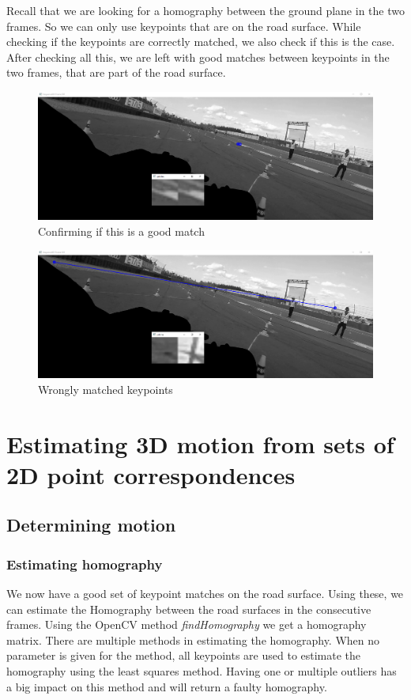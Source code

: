 Recall that we are looking for a homography between the ground plane in the two frames. So we can only use keypoints that are on the road surface. While checking if the keypoints are correctly matched, we also check if this is the case. After checking all this, we are left with good matches between keypoints in the two frames, that are part of the road surface.

\begin{figure}
    \centering
    \includegraphics[width=\textwidth]{figures/match_checking.png}
    \caption{Confirming if this is a good match}
    \label{fig:match_check}
\end{figure}
\begin{figure}
    \centering
    \includegraphics[width=\textwidth]{figures/match_checking_bad.png}
    \caption{Wrongly matched keypoints}
    \label{fig:bad_match}
\end{figure}

\section{Estimating 3D motion from sets of 2D point correspondences}
\subsection{Determining motion}
\subsubsection{Estimating homography}
We now have a good set of keypoint matches on the road surface. Using these, we can estimate the Homography between the road surfaces in the consecutive frames. Using the OpenCV method \textit{findHomography} we get a homography matrix. There are multiple methods in estimating the homography. When no parameter is given for the method, all keypoints are used to estimate the homography using the least squares method. Having one or multiple outliers has a big impact on this method and will return a faulty homography. \bigskip

